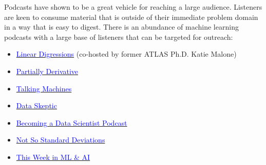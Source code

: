 Podcasts have shown to be a great vehicle for reaching a large audience. Listeners are keen to consume material that is outside of their immediate problem domain in a way that is easy to digest. There is an abundance of machine learning podcasts with a large base of listeners that can be targeted for outreach:
\begin{itemize}
 \item \href{http://lineardigressions.com/}{\textcolor{blue}{Linear Digressions}} (co-hosted by former ATLAS Ph.D. Katie Malone)
 \item \href{http://partiallyderivative.com/}{\textcolor{blue}{Partially Derivative}}
 \item \href{http://www.thetalkingmachines.com/}{\textcolor{blue}{Talking Machines}}
 \item \href{https://dataskeptic.com/}{\textcolor{blue}{Data Skeptic}}
 \item \href{http://becomingadatascientist.com/}{\textcolor{blue}{Becoming a Data Scientist Podcast}}
 \item \href{https://itunes.apple.com/us/podcast/not-so-standard-deviations/id1040614570?mt=2}{\textcolor{blue}{Not So Standard Deviations}}
 \item \href{https://twimlai.com/}{\textcolor{blue}{This Week in ML \& AI}}
\end{itemize}




